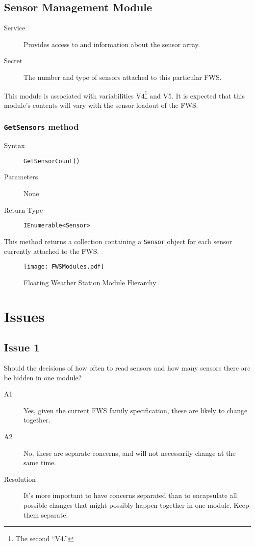 \documentclass[letterpaper,11pt]{article}
\begin{document}
\subsection{Sensor Management Module}
\begin{description}
\item[Service] Provides access to and information about the sensor array.
\item[Secret] The number and type of sensors attached to this particular FWS.
\end{description}
This module is associated with variabilities V4\footnote{The second ``V4.''} and V5.  It is expected that this module's contents will vary with the sensor loadout of the FWS.

\subsubsection{\texttt{GetSensors} method}

\begin{description}
\item[Syntax] \texttt{GetSensorCount()}
\item[Parameters] None
\item[Return Type] \texttt{IEnumerable<Sensor>}
\end{description}

This method returns a collection containing a \texttt{Sensor} object for each sensor currently attached to the FWS.

\begin{figure}[H]
  \centering
  \texttt{[image: FWSModules.pdf]}
  \caption{Floating Weather Station Module Hierarchy}
\end{figure}


\section{Issues}
\setcounter{secnumdepth}{1}
\subsection{Issue 1}
Should the decisions of how often to read sensors and how many sensors there are be hidden in one module?
\begin{description}
\item[A1] Yes, given the current FWS family specification, these are likely to change together.
\item[A2] No, these are separate concerns, and will not necessarily change at the same time.
\item[Resolution] It's more important to have concerns separated than to encapsulate all possible changes that might possibly happen together in one module.  Keep them separate.
\end{description}
\end{document}

